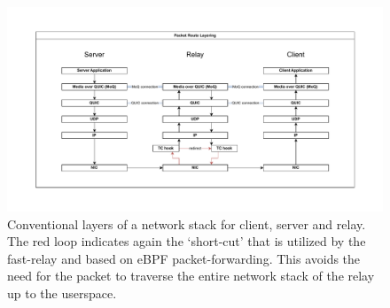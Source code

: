 \begin{figure}[htbp]
    \centering
    \includegraphics[width=\textwidth]{figures/02_background/route-layering.drawio.pdf}
    \caption{Conventional layers of a network stack for client, server and relay.
    The red loop indicates again the `short-cut' that is utilized by the fast-relay and 
    based on eBPF packet-forwarding.
    This avoids the need for the packet to traverse the entire network stack of the relay 
    up to the userspace.}\label{fig:route-layering}
\end{figure}
